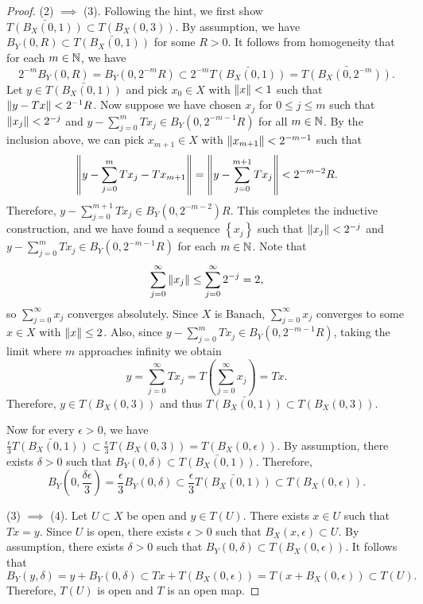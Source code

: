 \documentclass[a4paper]{article}
\begin{document}
\begin{proof}
  (2) $\implies$ (3). Following the hint, we first show
  $\bar{T(B_X(0, 1))} \subset T(B_X(0, 3))$.
  By assumption, we have
  $B_Y(0, R) \subset \bar{T(B_X(0, 1))}$ for some $R > 0$.
  It follows from homogeneity that for each $m \in \mathbb{N}$, we have
  \[
    2^{-m} B_Y(0, R) = B_Y(0, 2^{-m} R) \subset
    2^{-m} \bar{T(B_X(0, 1))} = \bar{T(B_X(0, 2^{-m}))}.
  \]
  Let $y \in \bar{T(B_X(0, 1))}$ and pick $x_0 \in X$ with $\left\lVert x\right\rVert < 1$
  such that $\left\lVert y - Tx\right\rVert < 2^{-1} R$. Now suppose we have chosen $x_j$
  for $0 \leq j \leq m$ such that $\left\lVert x_j\right\rVert < 2^{-j}$ and $y -
  \sum_{j=0}^m T x_j \in B_Y(0, 2^{-m - 1} R) $ for all $m \in \mathbb{N}$. By the
  inclusion above, we can pick $x_{m+1} \in X$ with $\left\lVert x_{m+1}\right\rVert <
  2^{-m-1}$ such that
  \[
    \left\lVert y - \sum_{j=0}^m T x_j - T x_{m+1}\right\rVert
    = \left\lVert y - \sum_{j=0}^{m+1} T x_j\right\rVert < 2^{-m-2} R.
  \]
  Therefore, $y - \sum_{j=0}^{m+1} T x_j \in B_Y(0, 2^{-m-2}) R$. This
  completes the inductive construction, and we have found a sequence
  $\left\{ x_j \right\}$ such that $\left\lVert x_j\right\rVert < 2^{-j}$ and $y -
  \sum_{j=0}^m T x_j \in B_Y (0, 2^{-m-1} R)$ for each $m \in \mathbb{N}$. Note
  that
  \[
    \sum_{j=0}^\infty \left\lVert x_j\right\rVert \leq \sum_{j=0}^{\infty} 2^{-j}
    = 2,
  \]
  so $\sum_{j=0}^\infty x_j$ converges absolutely. Since $X$ is Banach,
  $\sum_{j=0}^\infty x_j$ converges to some $x \in X$ with $\left\lVert x\right\rVert \leq
  2$. Also, since $y - \sum_{j=0}^m T x_j \in B_Y(0, 2^{-m-1}R)$, taking
  the limit where $m$ approaches infinity we obtain
  \[
    y = \sum_{j=0}^\infty T x_j = T \left( \sum_{j=0}^\infty x_j \right)
    = T x.
  \]
  Therefore, $y \in T(B_X(0, 3))$ and thus $\bar{T(B_X(0, 1))} \subset
  T(B_X (0,3))$.

  Now for every $\epsilon > 0$, we have $\frac{\epsilon}{3} \bar{T(B_X(0,
  1))} \subset \frac{\epsilon}{3} T(B_X(0, 3)) = T(B_X(0, \epsilon))$. By
  assumption, there exists $\delta > 0$ such that $B_Y(0, \delta) \subset
  \bar{T(B_X(0, 1))}$. Therefore,
  \[
    B_Y \left( 0, \frac{\delta \epsilon}{3} \right) = \frac{\epsilon}{3}
    B_Y(0, \delta) \subset \frac{\epsilon}{3} \bar{T(B_X(0, 1))}
    \subset T(B_X(0, \epsilon)).
  \]

  (3) $\implies$ (4). Let $U \subset X$ be open and $y \in T(U)$.
  There exists $x \in U$ such that $T x = y$. Since $U$ is open,
  there exists $\epsilon > 0$ such that $B_X(x, \epsilon)
    \subset U$. By assumption, there exists $\delta > 0$
  such that $B_Y(0, \delta) \subset T(B_X(0, \epsilon))$.
  It follows that
  \[
    B_Y(y, \delta) = y + B_Y(0, \delta) \subset Tx + T(B_X(0, \epsilon))
    = T(x + B_X(0, \epsilon)) \subset T(U).
  \]
  Therefore, $T(U)$ is open and $T$ is an open map.


\end{proof}
\end{document}
